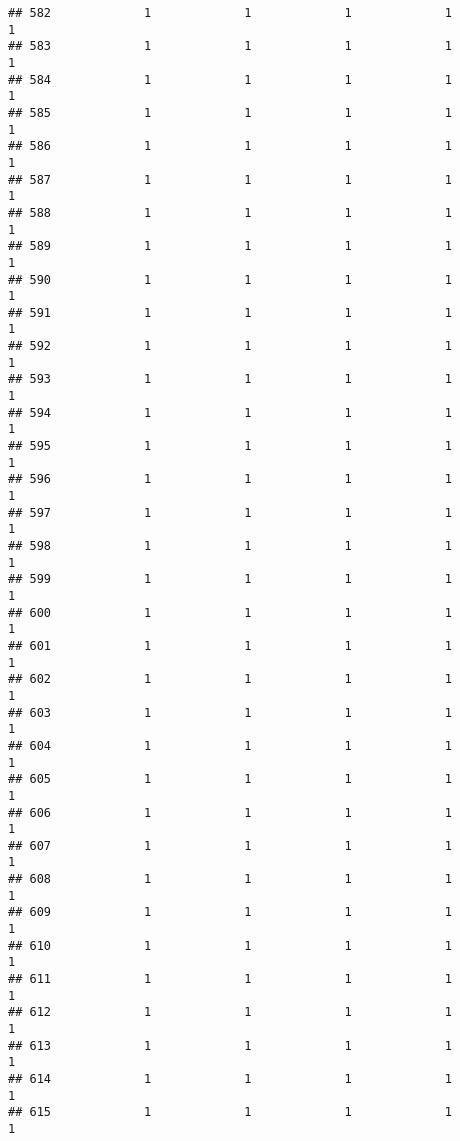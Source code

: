 \documentclass[
]{article}
\begin{document}
\begin{verbatim}
## 582             1             1             1             1             1
## 583             1             1             1             1             1
## 584             1             1             1             1             1
## 585             1             1             1             1             1
## 586             1             1             1             1             1
## 587             1             1             1             1             1
## 588             1             1             1             1             1
## 589             1             1             1             1             1
## 590             1             1             1             1             1
## 591             1             1             1             1             1
## 592             1             1             1             1             1
## 593             1             1             1             1             1
## 594             1             1             1             1             1
## 595             1             1             1             1             1
## 596             1             1             1             1             1
## 597             1             1             1             1             1
## 598             1             1             1             1             1
## 599             1             1             1             1             1
## 600             1             1             1             1             1
## 601             1             1             1             1             1
## 602             1             1             1             1             1
## 603             1             1             1             1             1
## 604             1             1             1             1             1
## 605             1             1             1             1             1
## 606             1             1             1             1             1
## 607             1             1             1             1             1
## 608             1             1             1             1             1
## 609             1             1             1             1             1
## 610             1             1             1             1             1
## 611             1             1             1             1             1
## 612             1             1             1             1             1
## 613             1             1             1             1             1
## 614             1             1             1             1             1
## 615             1             1             1             1             1

\end{verbatim}
\end{document}
